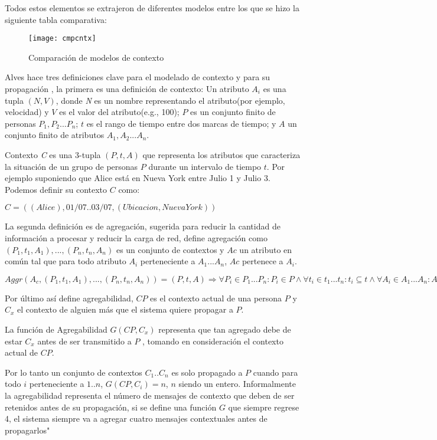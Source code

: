 Todos estos elementos se extrajeron de diferentes modelos entre los que se hizo la siguiente tabla comparativa:

\begin{figure}[h!]
  \centering
    \texttt{[image: cmpcntx]}
  \caption{Comparaci\'on de modelos de contexto\cite{ellis1994conceptual}\cite{montane2013context}\cite{gallardo2012framework}}
\end{figure}

Alves hace tres definiciones clave para el modelado de contexto y para su propagaci\'on \cite{alves2013radiator}, la primera es una definici\'on de contexto: Un atributo $A_{i}$ es una tupla $( N, V )$, donde \textit{N} es un nombre representando el atributo(por ejemplo, velocidad) y $V$ es el valor del atributo(e.g., 100); $P$ es un conjunto finito de personas ${P_{1},P_{2}...P_{n}}$; $t$ es el rango de tiempo entre dos marcas de tiempo; y $\textit{A}$ un conjunto finito de atributos ${A_{1},A_{2}...A_{n}}$.

Contexto \textit{C} es una 3-tupla $( P, t, A )$ que representa los atributos que caracteriza la situaci\'on de un grupo de personas $P$ durante un intervalo de tiempo $t$. Por ejemplo suponiendo que Alice est\'a en Nueva York entre Julio 1 y Julio 3. Podemos definir su contexto $C$ como:

$C=( ( Alice ), 01/07..03/07, ( Ubicacion, Nueva York ))$

La segunda definici\'on es de agregaci\'on, sugerida para reducir la cantidad de informaci\'on a procesar y reducir la carga de red, define agregaci\'on como ${ ( P_{1},t_{1},A_{1} ),..., ( P_{n},t_{n},A_{n} ) }$ es un conjunto de contextos y $Ac$ un atributo en com\'un tal que para todo atributo $A_{i}$ perteneciente a $A_{1} ... A_{n}$, $Ac$ pertenece a $A_{i}$.

$Aggr( A_{c}, {( P_{1},t_{1},A_{1} ),..., ( P_{n},t_{n},A_{n} )}) = ( P, t, A )\Rightarrow \forall P_{i}\in P_{1}...P_{n}:P_{i}\in P \wedge \forall t_{i} \in t_{1}...t_{n}:t_{i}\subseteq t \wedge \forall A_{i}\in A_{1}...A_{n}:A_{i}\in A$

Por \'ultimo as\'i define agregabilidad, $CP$ es el contexto actual de una persona $P$ y $C_{x}$ el contexto de alguien m\'as que el sistema quiere propagar a $P$.

La funci\'on de Agregabilidad $G( CP, C_{x} )$ representa que tan agregado debe de estar $C_{x}$ antes de ser transmitido a $P$ , tomando en consideraci\'on el contexto actual de $CP$.

Por lo tanto un conjunto de contextos $C_{1}..C_{n}$ es solo propagado a $P$ cuando para todo $i$ perteneciente a $1..n$, $G( CP, C_{i} ) = n$, $n$ siendo un entero. Informalmente la agregabilidad representa el n\'umero de mensajes de contexto que deben de ser retenidos antes de su propagaci\'on, si se define una funci\'on $G$ que siempre regrese 4, el sistema siempre va a agregar cuatro mensajes contextuales antes de propagarlos"

